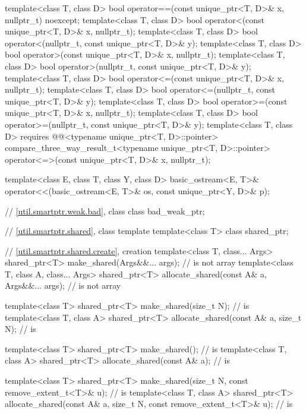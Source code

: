 \begin{codeblock}
{  template<class T, class D>
    bool operator==(const unique_ptr<T, D>& x, nullptr_t) noexcept;
  template<class T, class D>
    bool operator<(const unique_ptr<T, D>& x, nullptr_t);
  template<class T, class D>
    bool operator<(nullptr_t, const unique_ptr<T, D>& y);
  template<class T, class D>
    bool operator>(const unique_ptr<T, D>& x, nullptr_t);
  template<class T, class D>
    bool operator>(nullptr_t, const unique_ptr<T, D>& y);
  template<class T, class D>
    bool operator<=(const unique_ptr<T, D>& x, nullptr_t);
  template<class T, class D>
    bool operator<=(nullptr_t, const unique_ptr<T, D>& y);
  template<class T, class D>
    bool operator>=(const unique_ptr<T, D>& x, nullptr_t);
  template<class T, class D>
    bool operator>=(nullptr_t, const unique_ptr<T, D>& y);
  template<class T, class D>
    requires @@<typename unique_ptr<T, D>::pointer>
    compare_three_way_result_t<typename unique_ptr<T, D>::pointer>
      operator<=>(const unique_ptr<T, D>& x, nullptr_t);

  template<class E, class T, class Y, class D>
    basic_ostream<E, T>& operator<<(basic_ostream<E, T>& os, const unique_ptr<Y, D>& p);

  // \ref{util.smartptr.weak.bad}, class 
  class bad_weak_ptr;

  // \ref{util.smartptr.shared}, class template 
  template<class T> class shared_ptr;

  // \ref{util.smartptr.shared.create},  creation
  template<class T, class... Args>
    shared_ptr<T> make_shared(Args&&... args);                                  //  is not array
  template<class T, class A, class... Args>
    shared_ptr<T> allocate_shared(const A& a, Args&&... args);                  //  is not array

  template<class T>
    shared_ptr<T> make_shared(size_t N);                                        //  is 
  template<class T, class A>
    shared_ptr<T> allocate_shared(const A& a, size_t N);                        //  is 

  template<class T>
    shared_ptr<T> make_shared();                                                //  is 
  template<class T, class A>
    shared_ptr<T> allocate_shared(const A& a);                                  //  is 

  template<class T>
    shared_ptr<T> make_shared(size_t N, const remove_extent_t<T>& u);           //  is 
  template<class T, class A>
    shared_ptr<T> allocate_shared(const A& a, size_t N,
                                  const remove_extent_t<T>& u);                 //  is 

}
\end{codeblock}
